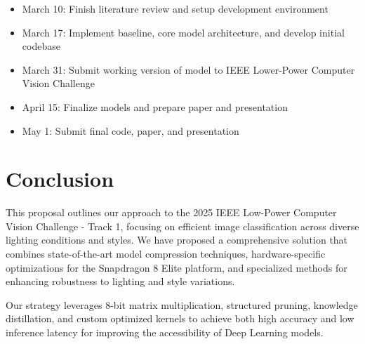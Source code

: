 \documentclass[11pt, oneside]{article}   	%
\begin{document}
\begin{itemize}
	\item March 10: Finish literature review and setup development environment
	\item March 17: Implement baseline, core model architecture, and develop initial codebase
	\item March 31: Submit working version of model to IEEE Lower-Power Computer Vision Challenge
	\item April 15: Finalize models and prepare paper and presentation
	\item May 1: Submit final code, paper, and presentation
\end{itemize}

\section*{Conclusion}

This proposal outlines our approach to the 2025 IEEE Low-Power Computer Vision Challenge - Track 1, focusing on efficient image classification across diverse lighting conditions and styles. We have proposed a comprehensive solution that combines state-of-the-art model compression techniques, hardware-specific optimizations for the Snapdragon 8 Elite platform, and specialized methods for enhancing robustness to lighting and style variations.

Our strategy leverages 8-bit matrix multiplication, structured pruning, knowledge distillation, and custom optimized kernels to achieve both high accuracy and low inference latency for improving the accessibility of Deep Learning models.

\printbibliography
\end{document}
